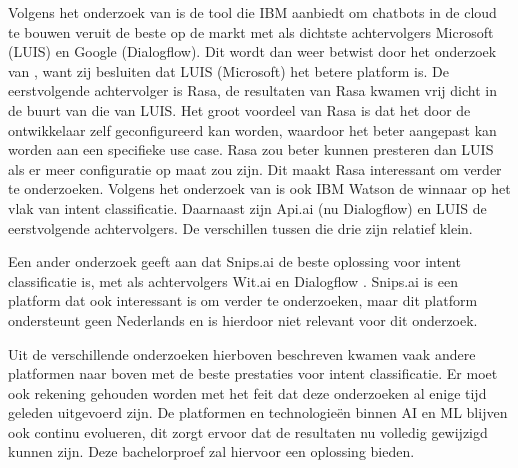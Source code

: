 Volgens het onderzoek van \textcite{Russis2018} is de tool die IBM aanbiedt om chatbots in de cloud te bouwen veruit de beste op de markt met als dichtste achtervolgers Microsoft (LUIS) en Google (Dialogflow). Dit wordt dan weer betwist door het onderzoek van \textcite{Langen2017}, want zij besluiten dat LUIS (Microsoft) het betere platform is. De eerstvolgende achtervolger is Rasa, de resultaten van Rasa kwamen vrij dicht in de buurt van die van LUIS. Het groot voordeel van Rasa is dat het door de ontwikkelaar zelf geconfigureerd kan worden, waardoor het beter aangepast kan worden aan een specifieke use case. Rasa zou beter kunnen presteren dan LUIS als er meer configuratie op maat zou zijn. Dit maakt Rasa interessant om verder te onderzoeken. Volgens het onderzoek van \textcite{Savenkov2017} is ook IBM Watson de winnaar op het vlak van intent classificatie. Daarnaast zijn Api.ai (nu Dialogflow) en LUIS de eerstvolgende achtervolgers. De verschillen tussen die drie zijn relatief klein.

Een ander onderzoek geeft aan dat Snips.ai de beste oplossing voor intent classificatie is,  met als achtervolgers Wit.ai en Dialogflow \autocite{Coucke2017}. Snips.ai is een platform dat ook interessant is om verder te onderzoeken, maar dit platform ondersteunt geen Nederlands en is hierdoor niet relevant voor dit onderzoek.

Uit de verschillende onderzoeken hierboven beschreven kwamen vaak andere platformen naar boven met de beste prestaties voor intent classificatie. Er moet ook rekening gehouden worden met het feit dat deze onderzoeken al enige tijd geleden uitgevoerd zijn. De platformen en technologieën binnen AI en ML blijven ook continu evolueren, dit zorgt ervoor dat de resultaten nu volledig gewijzigd kunnen zijn. Deze bachelorproef zal hiervoor een oplossing bieden.

















